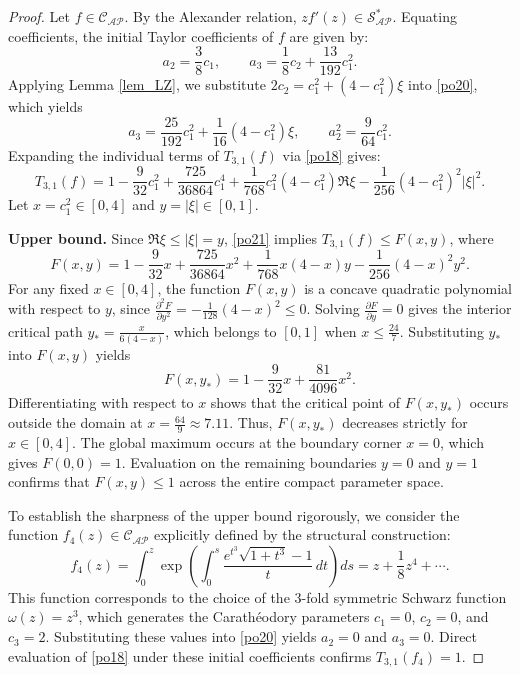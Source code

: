 \documentclass[11pt]{article}
\numberwithin{equation}{section}
\begin{document}
\begin{proof}
Let $f \in \mathcal{C}_{\mathcal{AP}}$. By the Alexander relation, $zf'(z) \in \mathcal{S}_{\mathcal{AP}}^{*}$. Equating coefficients, the initial Taylor coefficients of $f$ are given by:
\begin{equation}\label{po20}
a_2 = \frac{3}{8}c_1, \qquad a_3 = \frac{1}{8}c_2 + \frac{13}{192}c_1^2.
\end{equation}
Applying Lemma \ref{lem_LZ}, we substitute $2c_2 = c_1^2+(4-c_1^2)\xi$ into \eqref{po20}, which yields
\[
a_3 = \frac{25}{192}c_1^2 + \frac{1}{16}(4-c_1^2)\xi, \qquad a_2^2 = \frac{9}{64}c_1^2.
\]
Expanding the individual terms of $T_{3,1}(f)$ via \eqref{po18} gives:
\begin{equation}\label{po21}
T_{3,1}(f) = 1 -\frac{9}{32}c_1^2 +\frac{725}{36864}c_1^4 +\frac{1}{768}c_1^2(4-c_1^2)\Re\xi -\frac{1}{256}(4-c_1^2)^2|\xi|^2.
\end{equation}
Let $x=c_1^2 \in [0,4]$ and $y=|\xi| \in [0,1]$.

\medskip
\noindent\textbf{Upper bound.}
Since $\Re\xi \le |\xi| = y$, \eqref{po21} implies $T_{3,1}(f) \le F(x,y)$, where
\[
F(x,y) = 1 -\frac{9}{32}x +\frac{725}{36864}x^2 +\frac{1}{768}x(4-x)y -\frac{1}{256}(4-x)^2y^2.
\]
For any fixed $x\in[0,4]$, the function $F(x,y)$ is a concave quadratic polynomial with respect to $y$, since $\frac{\partial^2F}{\partial y^2} = -\frac{1}{128}(4-x)^2 \le 0$. Solving $\frac{\partial F}{\partial y} = 0$ gives the interior critical path $y_* = \frac{x}{6(4-x)}$, which belongs to $[0,1]$ when $x \le \frac{24}{7}$. Substituting $y_*$ into $F(x,y)$ yields
\[
F(x,y_*) = 1 -\frac{9}{32}x +\frac{81}{4096}x^2.
\]
Differentiating with respect to $x$ shows that the critical point of $F(x,y_*)$ occurs outside the domain at $x = \frac{64}{9} \approx 7.11$. Thus, $F(x,y_*)$ decreases strictly for $x \in [0, 4]$. The global maximum occurs at the boundary corner $x=0$, which gives $F(0,0)=1$. Evaluation on the remaining boundaries $y=0$ and $y=1$ confirms that $F(x,y) \le 1$ across the entire compact parameter space.

To establish the sharpness of the upper bound rigorously, we consider the function $f_4(z) \in \mathcal{C}_{\mathcal{AP}}$ explicitly defined by the structural construction:
\begin{equation}\label{ext4}
f_4(z) = \int_0^z \exp\left( \int_0^s \frac{e^{t^3}\sqrt{1+t^3}-1}{t}\,dt \right)ds = z+\frac{1}{8}z^4+\cdots.
\end{equation}
This function corresponds to the choice of the 3-fold symmetric Schwarz function $\omega(z)=z^3$, which generates the Carath\'{e}odory parameters $c_1=0$, $c_2=0$, and $c_3=2$. Substituting these values into \eqref{po20} yields $a_2=0$ and $a_3=0$. Direct evaluation of \eqref{po18} under these initial coefficients confirms $T_{3,1}(f_4)=1$.


\end{proof}
\end{document}
